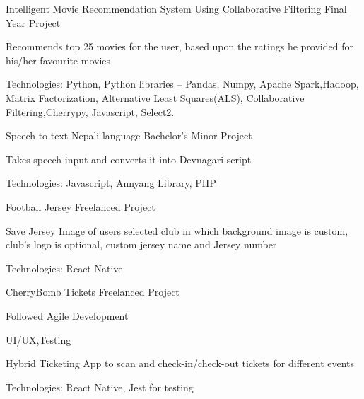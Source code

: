 
\begin{cventries}
  \cventry
    {} %
    {Intelligent Movie Recommendation System Using Collaborative Filtering} %
    {Final Year Project} %
    {} %
    {
      \begin{cvitems} %
        \item {Recommends top 25 movies for the user, based upon the ratings he provided for his/her favourite movies}
        \item {Technologies: Python, Python libraries – Pandas, Numpy, Apache Spark,Hadoop, Matrix Factorization, Alternative Least Squares(ALS), Collaborative Filtering,Cherrypy, Javascript, Select2.}
      \end{cvitems}
    }

  \cventry
    {} %
    {Speech to text Nepali language} %
    {Bachelor's Minor Project} %
    {} %
    {
      \begin{cvitems} %
      	\item {Takes speech input and converts it into Devnagari script}
      	 \item {Technologies: Javascript, Annyang Library, PHP}
      \end{cvitems}
    }
    
  \cventry
    {} %
    {Football Jersey} %
    {Freelanced Project} %
    {} %
    {
      \begin{cvitems} %
      	\item {Save Jersey Image of users selected club in which background image is custom, club's logo is optional, custom jersey name and Jersey number}
      	\item { Technologies: React Native }
      \end{cvitems}
    }
    
  \cventry
    {} %
    {CherryBomb Tickets} %
    {Freelanced Project} %
    {} %
    {
      \begin{cvitems} %
        \item{Followed Agile Development}
        \item{UI/UX,Testing}
      	\item {Hybrid Ticketing App to scan and check-in/check-out tickets for different events}
      	\item { Technologies: React Native, Jest for testing }
      \end{cvitems}
    }
    

\end{cventries}
